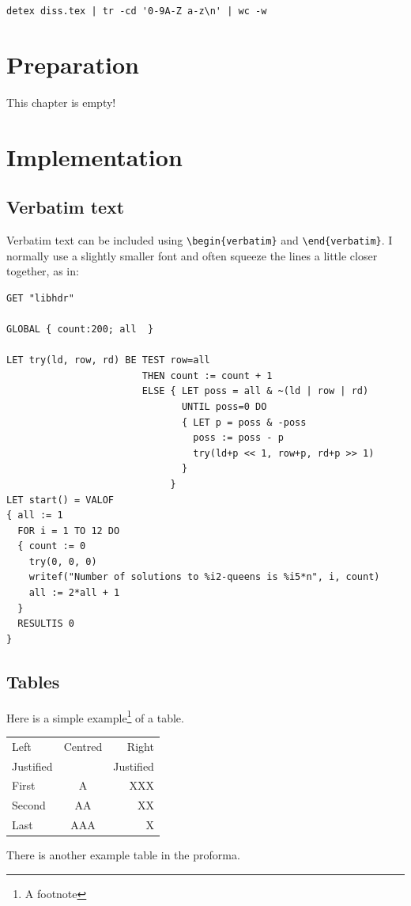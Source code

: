 \documentclass[12pt,a4paper,twoside,openright]{report}
\renewcommand{\baselinestretch}{1.1}    %
\begin{document}
\verb/detex diss.tex | tr -cd '0-9A-Z a-z\n' | wc -w/


\chapter{Preparation}

This chapter is empty!


\chapter{Implementation}

\section{Verbatim text}

Verbatim text can be included using \verb|\begin{verbatim}| and
\verb|\end{verbatim}|. I normally use a slightly smaller font and
often squeeze the lines a little closer together, as in:

{\renewcommand{\baselinestretch}{0.8}\small
\begin{verbatim}
GET "libhdr"
 
GLOBAL { count:200; all  }
 
LET try(ld, row, rd) BE TEST row=all
                        THEN count := count + 1
                        ELSE { LET poss = all & ~(ld | row | rd)
                               UNTIL poss=0 DO
                               { LET p = poss & -poss
                                 poss := poss - p
                                 try(ld+p << 1, row+p, rd+p >> 1)
                               }
                             }
LET start() = VALOF
{ all := 1
  FOR i = 1 TO 12 DO
  { count := 0
    try(0, 0, 0)
    writef("Number of solutions to %i2-queens is %i5*n", i, count)
    all := 2*all + 1
  }
  RESULTIS 0
}
\end{verbatim}
}

\section{Tables}

\begin{samepage}
Here is a simple example\footnote{A footnote} of a table.

\begin{center}
\begin{tabular}{l|c|r}
Left      & Centred & Right \\
Justified &         & Justified \\[3mm]
First     & A       & XXX \\
Second    & AA      & XX  \\
Last      & AAA     & X   \\
\end{tabular}
\end{center}

\noindent
There is another example table in the proforma.
\end{samepage}
\end{document}

